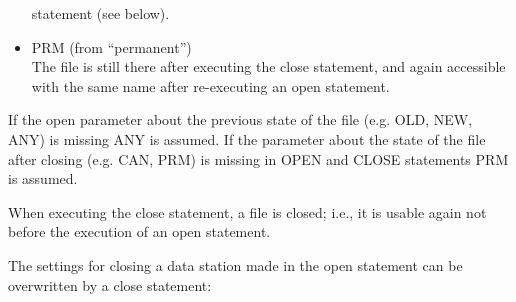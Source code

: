 \begin{itemize}
statement (see below).
\item PRM (from ``permanent'')\\
The file is still there after executing the close statement, and again
accessible with the same name after re-executing an open statement.
\end{itemize}


If the open parameter about the previous state of the file (e.g. OLD, NEW, ANY)
is missing ANY is assumed.
If the parameter about the state of the file after closing (e.g. CAN, PRM)
is missing in OPEN and CLOSE statements PRM is assumed.

When executing the close statement, a file is closed; i.e., it is
usable again not before the execution of an open statement.




The settings for closing a data station made in the open statement can
be overwritten by a close statement:



